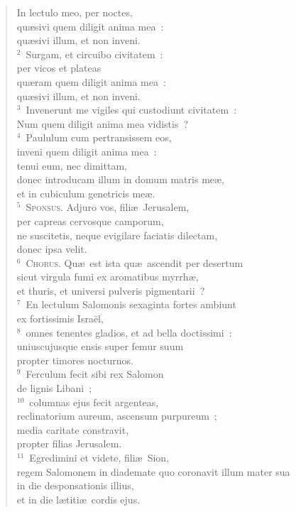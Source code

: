 \begin{flushleft}\begin{verse}\vspace{-19pt}In lectulo meo, per noctes,\\ qu\ae sivi quem diligit anima mea~:\\ qu\ae sivi illum, et non inveni.\\
${}^{2}$~Surgam, et circuibo civitatem~:\\ per vicos et plateas\\ qu\ae ram quem diligit anima mea~:\\ qu\ae sivi illum, et non inveni.\\
${}^{3}$~Invenerunt me vigiles qui custodiunt civitatem~:\\ Num quem diligit anima mea vidistis~?\\
${}^{4}$~Paululum cum pertransissem eos,\\ inveni quem diligit anima mea~:\\ tenui eum, nec dimittam,\\ donec introducam illum in domum matris me\ae ,\\ et in cubiculum genetricis me\ae .\\
${}^{5}$~\textsc{Sponsus.} Adjuro vos, fili\ae\ Jerusalem,\\ per capreas cervosque camporum,\\ ne suscitetis, neque evigilare faciatis dilectam,\\ donec ipsa velit.\\
${}^{6}$~\textsc{Chorus.} Qu\ae\ est ista qu\ae\ ascendit per desertum\\ sicut virgula fumi ex aromatibus myrrh\ae ,\\ et thuris, et universi pulveris pigmentarii~?\\
${}^{7}$~En lectulum Salomonis sexaginta fortes ambiunt\\ ex fortissimis Isra\"el,\\
${}^{8}$~omnes tenentes gladios, et ad bella doctissimi~:\\ uniuscujusque ensis super femur suum\\ propter timores nocturnos.\\
${}^{9}$~Ferculum fecit sibi rex Salomon\\ de lignis Libani~;\\
${}^{10}$~columnas ejus fecit argenteas,\\ reclinatorium aureum, ascensum purpureum~;\\ media caritate constravit,\\ propter filias Jerusalem.\\
${}^{11}$~Egredimini et videte, fili\ae\ Sion,\\ regem Salomonem in diademate quo coronavit illum mater sua\\ in die desponsationis illius,\\ et in die l\ae titi\ae\ cordis ejus.\end{verse}\end{flushleft}



